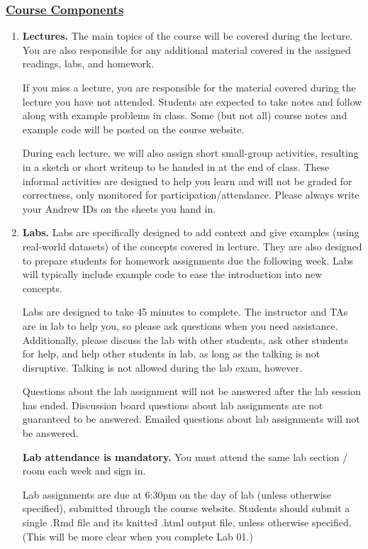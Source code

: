 \documentclass[11pt]{article}
\begin{document}
\vspace*{3mm}

\subsubsection*{\underline{Course Components}}
\begin{enumerate}
\item {\bf Lectures.} The main topics of the course will be covered during the lecture.  You are also responsible for any additional material covered in the assigned readings, labs, and homework.

If you miss a lecture, you are responsible for the material covered during the lecture you have not attended.
Students are expected to take notes and follow along with example problems in class.  Some (but not all) course notes and example code will be posted on the course website.

During each lecture, we will also assign short small-group activities, resulting in a sketch or short writeup to be handed in at the end of class. These informal activities are designed to help you learn and will not be graded for correctness, only monitored for participation/attendance. Please always write your Andrew IDs on the sheets you hand in.

\item {\bf Labs.}  Labs are specifically designed to add context and give examples (using real-world datasets) of the concepts covered in lecture.  They are also designed to prepare students for homework assignments due the following week.  Labs will typically include example code to ease the introduction into new concepts.

Labs are designed to take 45 minutes to complete.  The instructor and TAs are in lab to help you, so please ask questions when you need assistance.  Additionally, please discuss the lab with other students, ask other students for help, and help other students in lab, as long as the talking is not disruptive.  Talking is not allowed during the lab exam, however. 

Questions about the lab assignment will not be answered after the lab session has ended.  Discussion board questions about lab assignments are not guaranteed to be answered.  Emailed questions about lab assignments will not be answered. 

\textbf{Lab attendance is mandatory.}  You must attend the same lab section / room each week and sign in.

Lab assignments are due at 6:30pm on the day of lab (unless otherwise specified), submitted through the course website.  Students should submit a single .Rmd file and its knitted .html output file, unless otherwise specified.  (This will be more clear when you complete Lab 01.)


\end{enumerate}
\end{document}
